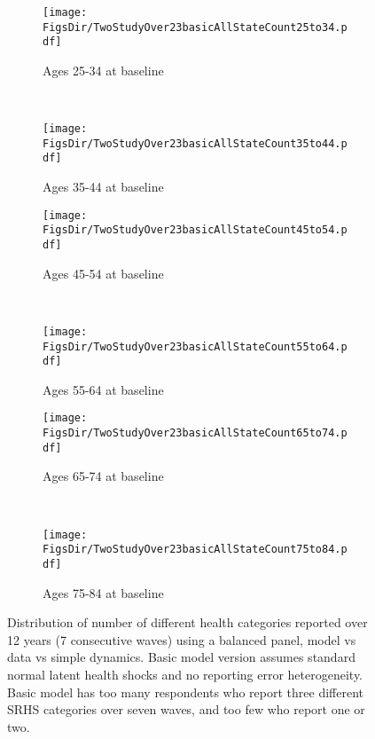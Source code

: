 \documentclass[12pt,pdftex,letterpaper]{article}
\newcommand{\RootDir}{..}
\newcommand{\FigsDir}{\RootDir/Figures}
\begin{document}
\begin{figure}
	\centering
	\begin{subfigure}[b]{0.48\textwidth}
		\texttt{[image: \\FigsDir/TwoStudyOver23basicAllStateCount25to34.pdf]}
		\caption{Ages 25-34 at baseline}\label{fig:StateCount25to34basic}
	\end{subfigure}
	~
	\begin{subfigure}[b]{0.48\textwidth}
		\texttt{[image: \\FigsDir/TwoStudyOver23basicAllStateCount35to44.pdf]}
		\caption{Ages 35-44 at baseline}\label{fig:StateCount35to44basic}
	\end{subfigure}
	
	\begin{subfigure}[b]{0.48\textwidth}
		\texttt{[image: \\FigsDir/TwoStudyOver23basicAllStateCount45to54.pdf]}
		\caption{Ages 45-54 at baseline}\label{fig:StateCount45to54basic}
	\end{subfigure}
	~
	\begin{subfigure}[b]{0.48\textwidth}
		\texttt{[image: \\FigsDir/TwoStudyOver23basicAllStateCount55to64.pdf]}
		\caption{Ages 55-64 at baseline}\label{fig:StateCount55to64basic}
	\end{subfigure}
	
	
	\begin{subfigure}[b]{0.48\textwidth}
		\texttt{[image: \\FigsDir/TwoStudyOver23basicAllStateCount65to74.pdf]}
		\caption{Ages 65-74 at baseline}\label{fig:StateCount65to74basic}
	\end{subfigure}
	~
	\begin{subfigure}[b]{0.48\textwidth}
		\texttt{[image: \\FigsDir/TwoStudyOver23basicAllStateCount75to84.pdf]}
		\caption{Ages 75-84 at baseline}\label{fig:StateCount75to84basic}
	\end{subfigure}
	\caption{Distribution of number of different health categories reported over 12 years (7 consecutive waves) using a balanced panel, model vs data vs simple dynamics. Basic model version assumes standard normal latent health shocks and no reporting error heterogeneity. Basic model has too many respondents who report three different SRHS categories over seven waves, and too few who report one or two.}\label{fig:StateCountTwoStudyBasic}
\end{figure}
\end{document}
